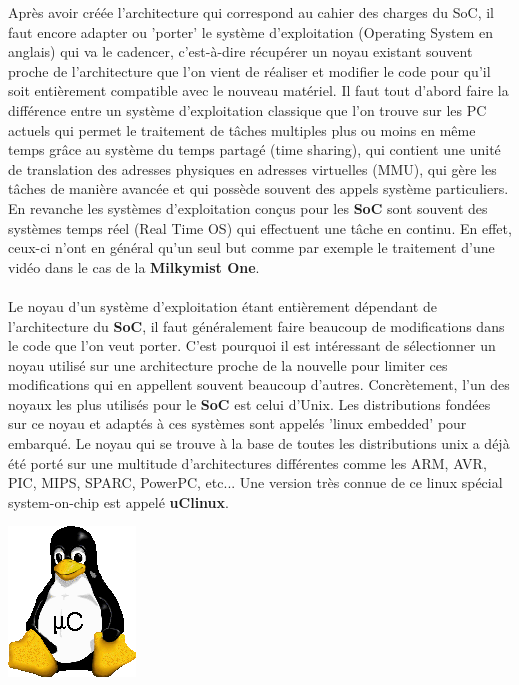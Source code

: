 \vspace{15px}
Après avoir créée l'architecture qui correspond au cahier des charges du SoC, il faut encore adapter ou 'porter' le système d'exploitation (Operating System en anglais) qui va le cadencer, c'est-à-dire récupérer un noyau existant souvent proche de l'architecture que l'on vient de réaliser et modifier le code pour qu'il soit entièrement compatible avec le nouveau matériel. 
Il faut tout d'abord faire la différence entre un système d'exploitation classique que l'on trouve sur les PC actuels qui permet le traitement de tâches multiples plus ou moins en même temps grâce au système du temps partagé (time sharing), qui contient une unité de translation des adresses physiques en adresses virtuelles (MMU), qui gère les tâches de manière avancée et qui possède souvent des appels système particuliers. En revanche les systèmes d'exploitation conçus pour les {\bf SoC} sont souvent des systèmes temps réel (Real Time OS) qui effectuent une tâche en continu. En effet, ceux-ci n'ont en général qu'un seul but comme par exemple le traitement d'une vidéo dans le cas de la {\bf Milkymist One}.\\
\\
Le noyau d'un système d'exploitation étant entièrement dépendant de l'architecture du {\bf SoC}, il faut généralement faire beaucoup de modifications dans le code que l'on veut porter. C'est pourquoi il est intéressant de sélectionner un noyau utilisé sur une architecture proche de la nouvelle pour limiter ces modifications qui en appellent souvent beaucoup d'autres.
Concrètement, l'un des noyaux les plus utilisés pour le {\bf SoC} est celui d'Unix. Les distributions fondées sur ce noyau et adaptés à ces systèmes sont appelés 'linux embedded' pour embarqué. Le noyau qui se trouve à la base de toutes les distributions unix a déjà été porté sur une multitude d'architectures différentes comme les ARM, AVR, PIC, MIPS, SPARC, PowerPC, etc... Une version très connue de ce linux spécial system-on-chip est appelé {\bf uClinux}.\\
\begin{center}
\includegraphics[scale=0.4]{uclinux.png}
\end{center}
